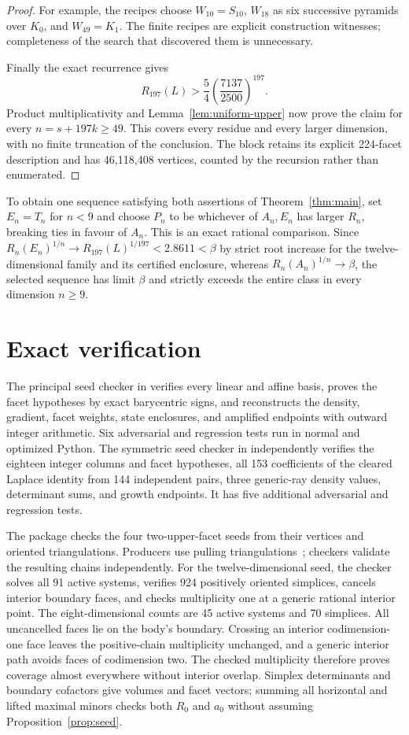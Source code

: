 \documentclass[11pt]{article}
\begin{document}
\begin{proof}
For example, the recipes choose $W_{10}=S_{10}$, $W_{18}$ as six
successive pyramids over $K_0$, and $W_{49}=K_1$.
The finite recipes are explicit construction witnesses; completeness of
the search that discovered them is unnecessary.

Finally the exact recurrence gives
\[
 R_{197}(L)>\frac54\left(\frac{7137}{2500}\right)^{197}.
\]
Product multiplicativity and Lemma~\ref{lem:uniform-upper} now prove
the claim for every $n=s+197k\ge49$. This covers every residue and every
larger dimension, with no finite truncation of the conclusion.
The block retains its explicit 224-facet description and has 46,118,408
vertices, counted by the recursion rather than enumerated.
\end{proof}

To obtain one sequence satisfying both assertions of
Theorem~\ref{thm:main}, set $E_n=T_n$ for $n<9$ and choose $P_n$ to be
whichever of $A_n,E_n$ has larger $R_n$, breaking ties in favour of $A_n$.
This is an exact rational comparison. Since
$R_n(E_n)^{1/n}\to R_{197}(L)^{1/197}<2.8611<\beta$ by strict root
increase for the twelve-dimensional family and its certified enclosure,
whereas $R_n(A_n)^{1/n}\to\beta$, the selected sequence has limit
$\beta$ and strictly exceeds the entire class in every dimension $n\ge9$.

\section{Exact verification}
The principal seed checker in  verifies
every linear and affine basis, proves the facet hypotheses by exact
barycentric signs, and reconstructs the density, gradient, facet weights,
state enclosures, and amplified endpoints with outward integer arithmetic.
Six adversarial and regression tests run in normal and optimized Python.
The symmetric seed checker in  independently
verifies the eighteen integer columns and facet hypotheses, all 153
coefficients of the cleared Laplace identity from 144 independent pairs,
three generic-ray density values, determinant sums, and growth endpoints.
It has five additional adversarial and regression tests.

The  package checks the four two-upper-facet seeds
from their vertices and oriented triangulations. Producers use pulling
triangulations~\cite{triangulations}; checkers validate the resulting
chains independently. For the twelve-dimensional seed, the checker
solves all 91 active systems, verifies 924 positively oriented simplices,
cancels interior boundary faces, and checks multiplicity one at a generic
rational interior point. The eight-dimensional counts are 45 active
systems and 70 simplices. All uncancelled faces lie on the body's boundary.
Crossing an interior codimension-one face leaves the positive-chain
multiplicity unchanged, and a generic interior path avoids faces of
codimension two. The checked multiplicity therefore proves coverage
almost everywhere without interior overlap. Simplex determinants and
boundary cofactors give volumes and facet vectors; summing all horizontal
and lifted maximal minors checks both $R_0$ and $a_0$ without assuming
Proposition~\ref{prop:seed}.
\end{document}
